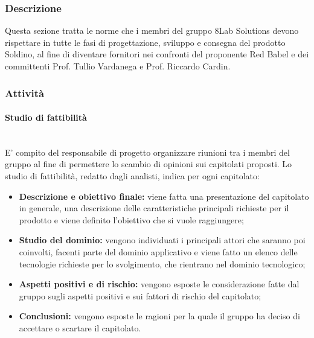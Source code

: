	\subsubsection{Descrizione}
	Questa sezione tratta le norme che i membri del gruppo 8Lab Solutions devono rispettare in tutte le fasi di progettazione, sviluppo e consegna del prodotto Soldino, al fine di diventare fornitori nei confronti del proponente Red Babel e dei committenti Prof. Tullio Vardanega e Prof. Riccardo Cardin.
	\subsubsection{Attività}
		\paragraph{Studio di fattibilità} \mbox{}\\ 
		E' compito del responsabile di progetto organizzare riunioni tra i membri del gruppo al fine di permettere lo scambio di opinioni sui capitolati proposti.
		Lo studio di fattibilità, redatto dagli analisti, indica per ogni capitolato:
		\begin{itemize}
			\item \textbf{Descrizione e obiettivo finale:} viene fatta una presentazione del capitolato in generale, una descrizione delle caratteristiche principali richieste per il prodotto e viene definito l'obiettivo che si vuole raggiungere;
			\item \textbf{Studio del dominio:} vengono individuati i principali attori che saranno poi coinvolti, facenti parte del dominio applicativo e viene fatto un elenco delle tecnologie richieste per lo svolgimento, che rientrano nel dominio tecnologico;
			\item \textbf{Aspetti positivi e di rischio:} vengono esposte le considerazione fatte dal gruppo sugli aspetti positivi e sui fattori di rischio del capitolato;
			\item \textbf{Conclusioni:} vengono esposte le ragioni per la quale il gruppo ha deciso di accettare o scartare il capitolato.
		\end{itemize}
